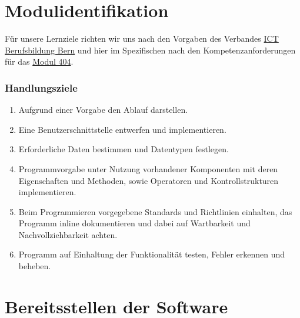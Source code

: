 \mode*




\section{Modulidentifikation}
\label{sec:identification}

Für unsere Lernziele richten wir uns nach den Vorgaben des Verbandes
\href{https://ict-berufsbildung-bern.ch}{ICT Berufsbildung Bern} und hier im Spezifischen
nach den Kompetenzanforderungen für das
\href{https://cf.ict-berufsbildung.ch/modules.php?name=Mbk&a=20101&cmodnr=404&noheader=1}
{Modul 404}.

\begin{frame}[fragile]
    \frametitle<presentation>{Handlungsziele}

    \begin{enumerate}
        \item Aufgrund einer Vorgabe den Ablauf darstellen.
        \item Eine Benutzerschnittstelle entwerfen und implementieren.
        \item Erforderliche Daten bestimmen und Datentypen festlegen.
        \item Programmvorgabe unter Nutzung vorhandener Komponenten mit deren Eigenschaften und Methoden, sowie
        Operatoren und Kontrollstrukturen implementieren.
        \item Beim Programmieren vorgegebene Standards und Richtlinien einhalten, das Programm inline dokumentieren und
        dabei auf Wartbarkeit und Nachvollziehbarkeit achten.
        \item Programm auf Einhaltung der Funktionalität testen, Fehler erkennen und beheben.
    \end{enumerate}

\end{frame}



\section{Bereitsstellen der Software}
\label{sec:java-technologie}

